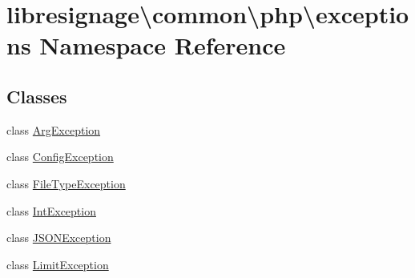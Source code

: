 \hypertarget{namespacelibresignage_1_1common_1_1php_1_1exceptions}{}\section{libresignage\textbackslash{}common\textbackslash{}php\textbackslash{}exceptions Namespace Reference}
\label{namespacelibresignage_1_1common_1_1php_1_1exceptions}
\subsection*{Classes}
\begin{DoxyCompactItemize}
\item 
class \hyperlink{classlibresignage_1_1common_1_1php_1_1exceptions_1_1ArgException}{Arg\+Exception}
\item 
class \hyperlink{classlibresignage_1_1common_1_1php_1_1exceptions_1_1ConfigException}{Config\+Exception}
\item 
class \hyperlink{classlibresignage_1_1common_1_1php_1_1exceptions_1_1FileTypeException}{File\+Type\+Exception}
\item 
class \hyperlink{classlibresignage_1_1common_1_1php_1_1exceptions_1_1IntException}{Int\+Exception}
\item 
class \hyperlink{classlibresignage_1_1common_1_1php_1_1exceptions_1_1JSONException}{J\+S\+O\+N\+Exception}
\item 
class \hyperlink{classlibresignage_1_1common_1_1php_1_1exceptions_1_1LimitException}{Limit\+Exception}
\end{DoxyCompactItemize}
